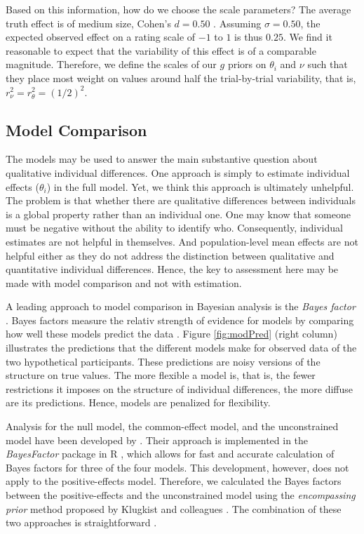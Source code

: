 \documentclass[
  english,
  ,man,floatsintext]{apa6}
\begin{document}
Based on this information, how do we choose the scale parameters? The average truth effect is of medium size, Cohen's \(d = 0.50\) \autocite{dechene2010}. Assuming \(\sigma = 0.50\), the expected observed effect on a rating scale of \(-1\) to \(1\) is thus \(0.25\). We find it reasonable to expect that the variability of this effect is of a comparable magnitude. Therefore, we define the scales of our \(g\) priors on \(\theta_i\) and \(\nu\) such that they place most weight on values around half the trial-by-trial variability, that is, \(r_\nu^2 = r_\theta^2 = (1/2)^2\).

\hypertarget{model-comparison}{%
\subsection{Model Comparison}\label{model-comparison}}

The models may be used to answer the main substantive question about qualitative individual differences. One approach is simply to estimate individual effects (\(\theta_i\)) in the full model. Yet, we think this approach is ultimately unhelpful. The problem is that whether there are qualitative differences between individuals is a global property rather than an individual one. One may know that someone must be negative without the ability to identify who. Consequently, individual estimates are not helpful in themselves. And population-level mean effects are not helpful either as they do not address the distinction between qualitative and quantitative individual differences. Hence, the key to assessment here may be made with model comparison and not with estimation.

A leading approach to model comparison in Bayesian analysis is the \textit{Bayes factor} \autocite{jeffreys1935,jeffreys1961}. Bayes factors measure the relativ strength of evidence for models by comparing how well these models predict the data \autocite{rouder2017,kass1995}. Figure \ref{fig:modPred} (right column) illustrates the predictions that the different models make for observed data of the two hypothetical participants. These predictions are noisy versions of the structure on true values. The more flexible a model is, that is, the fewer restrictions it imposes on the structure of individual differences, the more diffuse are its predictions. Hence, models are penalized for flexibility.

Analysis for the null model, the common-effect model, and the unconstrained model have been developed by \textcite{rouder2012}. Their approach is implemented in the \textit{BayesFactor} package \autocite{morey2015} in R \autocite{rcoreteam2019}, which allows for fast and accurate calculation of Bayes factors for three of the four models. This development, however, does not apply to the positive-effects model. Therefore, we calculated the Bayes factors between the positive-effects and the unconstrained model using the \textit{encompassing prior} method proposed by Klugkist and colleagues \autocite{klugkist2007,klugkist2005}. The combination of these two approaches is straightforward \parencite[e.g.,][]{haaf2017, haaf2019}.
\end{document}

